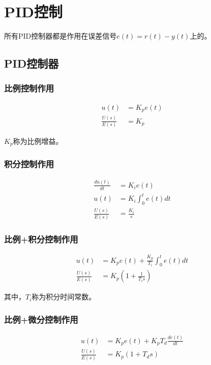 \section{PID控制}

所有PID控制器都是作用在误差信号$e(t)=r(t)-y(t)$上的。

\subsection{PID控制器}

\subsubsection{比例控制作用}

\begin{align*}
u(t)&=K_pe(t)\\
\frac{U(s)}{E(s)}&=K_p
\end{align*}

$K_p$称为比例增益。

\subsubsection{积分控制作用}

\begin{align*}
\frac{du(t)}{dt}&=K_ie(t)\\
u(t)&=K_i\int_0^te(t)dt\\
\frac{U(s)}{E(s)}&=\frac{K_i}{s}
\end{align*}

\subsubsection{比例+积分控制作用}

\begin{align*}
u(t)&=K_pe(t)+\frac{K_p}{T_i}\int_0^te(t)dt\\
\frac{U(s)}{E(s)}&=K_p\left(1+\frac{1}{T_is}\right)
\end{align*}

其中，$T_i$称为积分时间常数。

\subsubsection{比例+微分控制作用}

\begin{align*}
u(t)&=K_pe(t)+K_pT_d\frac{de(t)}{dt}\\
\frac{U(s)}{E(s)}&=K_p(1+T_ds)
\end{align*}

